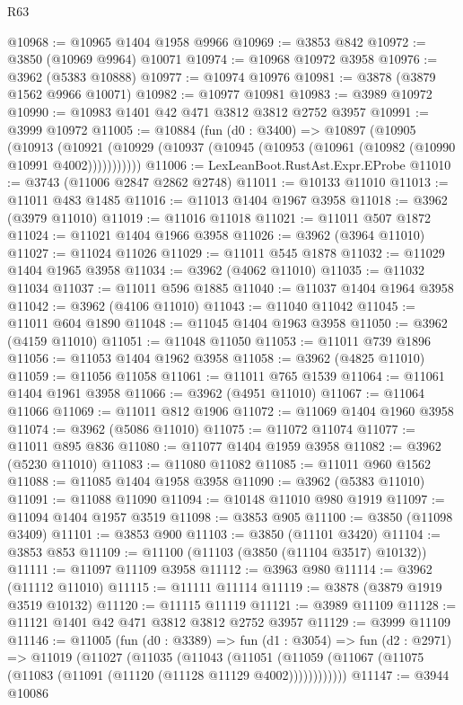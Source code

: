 \begin{lexlean}{R63}
\begin{coremodule}
@10968 := @10965 @1404 @1958 @9966
@10969 := @3853 @842
@10972 := @3850 (@10969 @9964) @10071
@10974 := @10968 @10972 @3958
@10976 := @3962 (@5383 @10888)
@10977 := @10974 @10976
@10981 := @3878 (@3879 @1562 @9966 @10071)
@10982 := @10977 @10981
@10983 := @3989 @10972
@10990 := @10983 @1401 @42 @471 @3812 @3812 @2752 @3957
@10991 := @3999 @10972
@11005 := @10884
    (fun (d0 : @3400) =>
    @10897
      (@10905
        (@10913
          (@10921 (@10929 (@10937 (@10945 (@10953 (@10961 (@10982 (@10990 @10991 @4002)))))))))))
@11006 := LexLeanBoot.RustAst.Expr.EProbe
@11010 := @3743 (@11006 @2847 @2862 @2748)
@11011 := @10133 @11010
@11013 := @11011 @483 @1485
@11016 := @11013 @1404 @1967 @3958
@11018 := @3962 (@3979 @11010)
@11019 := @11016 @11018
@11021 := @11011 @507 @1872
@11024 := @11021 @1404 @1966 @3958
@11026 := @3962 (@3964 @11010)
@11027 := @11024 @11026
@11029 := @11011 @545 @1878
@11032 := @11029 @1404 @1965 @3958
@11034 := @3962 (@4062 @11010)
@11035 := @11032 @11034
@11037 := @11011 @596 @1885
@11040 := @11037 @1404 @1964 @3958
@11042 := @3962 (@4106 @11010)
@11043 := @11040 @11042
@11045 := @11011 @604 @1890
@11048 := @11045 @1404 @1963 @3958
@11050 := @3962 (@4159 @11010)
@11051 := @11048 @11050
@11053 := @11011 @739 @1896
@11056 := @11053 @1404 @1962 @3958
@11058 := @3962 (@4825 @11010)
@11059 := @11056 @11058
@11061 := @11011 @765 @1539
@11064 := @11061 @1404 @1961 @3958
@11066 := @3962 (@4951 @11010)
@11067 := @11064 @11066
@11069 := @11011 @812 @1906
@11072 := @11069 @1404 @1960 @3958
@11074 := @3962 (@5086 @11010)
@11075 := @11072 @11074
@11077 := @11011 @895 @836
@11080 := @11077 @1404 @1959 @3958
@11082 := @3962 (@5230 @11010)
@11083 := @11080 @11082
@11085 := @11011 @960 @1562
@11088 := @11085 @1404 @1958 @3958
@11090 := @3962 (@5383 @11010)
@11091 := @11088 @11090
@11094 := @10148 @11010 @980 @1919
@11097 := @11094 @1404 @1957 @3519
@11098 := @3853 @905
@11100 := @3850 (@11098 @3409)
@11101 := @3853 @900
@11103 := @3850 (@11101 @3420)
@11104 := @3853 @853
@11109 := @11100 (@11103 (@3850 (@11104 @3517) @10132))
@11111 := @11097 @11109 @3958
@11112 := @3963 @980
@11114 := @3962 (@11112 @11010)
@11115 := @11111 @11114
@11119 := @3878 (@3879 @1919 @3519 @10132)
@11120 := @11115 @11119
@11121 := @3989 @11109
@11128 := @11121 @1401 @42 @471 @3812 @3812 @2752 @3957
@11129 := @3999 @11109
@11146 := @11005
    (fun (d0 : @3389) =>
    fun (d1 : @3054) =>
    fun (d2 : @2971) =>
    @11019
      (@11027
        (@11035
          (@11043
            (@11051 (@11059 (@11067 (@11075 (@11083 (@11091 (@11120 (@11128 @11129 @4002))))))))))))
@11147 := @3944 @10086

\end{coremodule}
\end{lexlean}
